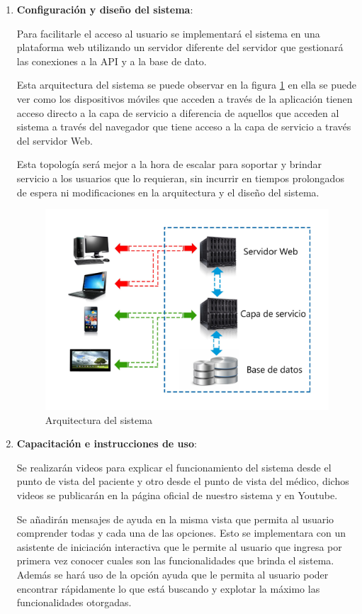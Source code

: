 \begin{enumerate}
\item \textbf{Configuración y diseño del sistema}:

Para facilitarle el acceso al usuario se implementará el sistema en una plataforma web utilizando un servidor diferente del servidor que gestionará las conexiones a la  API y a la base de dato.

Esta arquitectura del sistema se puede observar en la figura \ref{arquitectura} en ella se puede ver como los dispositivos móviles que acceden a través de la aplicación tienen acceso directo a la capa de servicio a diferencia de aquellos que acceden al sistema a través del navegador que tiene acceso a la capa de servicio a través del servidor Web.

Esta topología será mejor a la hora de escalar para soportar y brindar servicio a los usuarios que lo requieran, sin incurrir en tiempos prolongados de espera ni modificaciones en la arquitectura y el diseño del sistema.

 \begin{figure}
  \centering
  \includegraphics[width=.8\textwidth]{img/tp1_integrador/arquitectura_del_sistema}
  \caption{Arquitectura del sistema}
  \label{arquitectura}
\end{figure}

\item \textbf{Capacitación e instrucciones de uso}:

Se realizarán videos para explicar el funcionamiento del sistema desde el punto de vista del paciente  y otro desde el punto de vista del médico, dichos videos se publicarán en la página oficial de nuestro sistema y en Youtube.

Se añadirán mensajes de ayuda en la misma vista que permita al usuario comprender todas y cada una de las opciones. Esto se implementara con un asistente de iniciación interactiva que le permite al usuario que ingresa por primera vez conocer cuales son las funcionalidades que brinda el sistema. Además se hará uso de la opción ayuda que le permita al usuario poder encontrar rápidamente lo que está buscando y explotar la máximo las funcionalidades otorgadas.


\end{enumerate}
